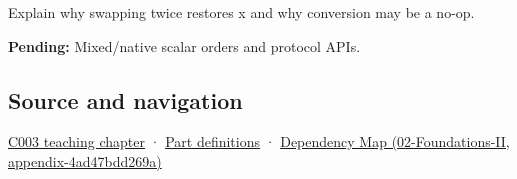 Explain why swapping twice restores x and why conversion may be a no-op.

\textbf{Pending:} Mixed/native scalar orders and protocol APIs.

\subsection{Source and navigation}\label{source-and-navigation}

\href{Continuous\%20Notes/Computing\%20Foundations\%20-\%20From\%20Bits\%20to\%20C++\%20and\%20Systems\%20APIs\#Where\%20the\%20bytes\%20live}{C003 teaching chapter} · \hyperref[appendix-fd090d982a15]{Part definitions} · \href{}{Dependency Map (02-Foundations-II, appendix-4ad47bdd269a)}
